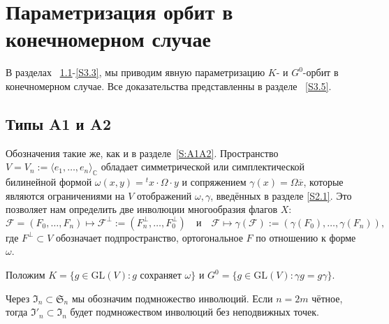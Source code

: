 \documentclass{amsart}
\theoremstyle{definition}
\begin{document}


\section{Параметризация орбит в конечномерном случае}

\label{S3}

В разделах ~\ref{S3.1}-\ref{S3.3}, мы приводим явную параметризацию $K$- и $G^0$-орбит в конечномерном случае. Все доказательства представленны в разделе  ~\ref{S3.5}.

\subsection{Типы A1 и A2}
\label{S3.1}
Обозначения такие же, как и в разделе~\ref{S:A1A2}.
Пространство $V=V_n:=\langle e_1,\ldots,e_n\rangle_\mathbb{C}$ обладает симметрической или симплектической билинейной формой $\omega(x,y)={}^tx\cdot \Omega\cdot y$ и сопряжением $\gamma(x)=\Omega\overline{x}$, которые  являются ограничениями на $V$ отображений $\omega,\gamma$, введённых в разделе \ref{S2.1}.
Это позволяет нам определить две инволюции многообразия флагов $X$:
\[
\mathcal{F}=(F_0,\ldots,F_n)\mapsto\mathcal{F}^\perp:=(F_n^\perp,\ldots,F_0^\perp)
\quad\mbox{и}\quad
\mathcal{F}\mapsto\gamma(\mathcal{F}):=(\gamma(F_0),\ldots,\gamma(F_n)),
\]
где $F^\perp\subset V$ обозначает подпространство, ортогональное  $F$ по отношению к форме $\omega$.

Положим $K=\{g\in\mathrm{GL}(V):\mbox{$g$ сохраняет $\omega$}\}$
и $G^0=\{g\in\mathrm{GL}(V):\gamma g=g\gamma\}$.

Через $\mathfrak{I}_n\subset\mathfrak{S}_n$ мы обозначим подмножество инволюций.
Если $n=2m$ чётное, тогда $\mathfrak{I}'_n\subset\mathfrak{I}_n$
будет подмножеством инволюций  без неподвижных точек.
\end{document}
